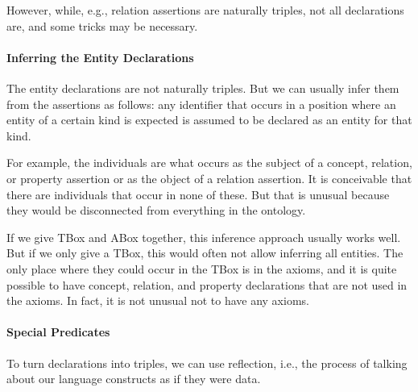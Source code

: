 However, while, e.g., relation assertions are naturally triples, not all declarations are, and some tricks may be necessary.

\paragraph{Inferring the Entity Declarations}
The entity declarations are not naturally triples.
But we can usually infer them from the assertions as follows: any identifier that occurs in a position where an entity of a certain kind is expected is assumed to be declared as an entity for that kind.

For example, the individuals are what occurs as the subject of a concept, relation, or property assertion or as the object of a relation assertion.
It is conceivable that there are individuals that occur in none of these.
But that is unusual because they would be disconnected from everything in the ontology.

If we give TBox and ABox together, this inference approach usually works well.
But if we only give a TBox, this would often not allow inferring all entities.
The only place where they could occur in the TBox is in the axioms, and it is quite possible to have concept, relation, and property declarations that are not used in the axioms.
In fact, it is not unusual not to have any axioms.

\paragraph{Special Predicates}
To turn declarations into triples, we can use reflection, i.e., the process of talking about our language constructs as if they were data.

